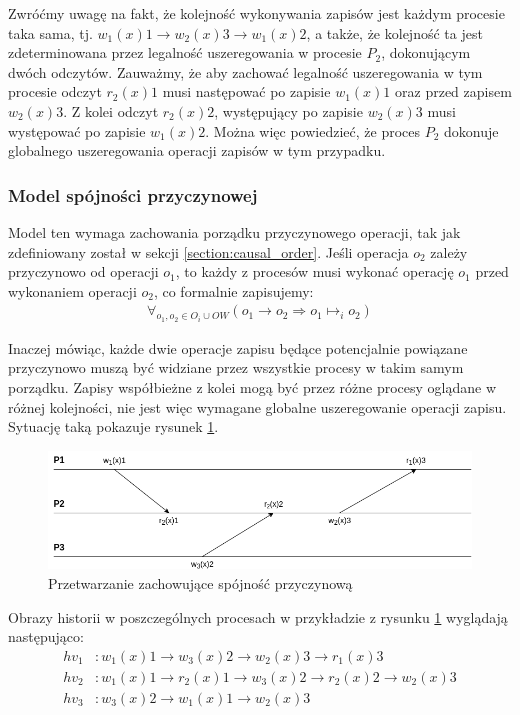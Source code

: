 Zwróćmy uwagę na fakt, że kolejność wykonywania zapisów jest każdym procesie taka sama, tj. $ w_1(x)1 \rightarrow w_2(x)3 \rightarrow w_1(x)2 $, a także, że kolejność ta jest zdeterminowana przez legalność uszeregowania w procesie $ P_2 $, dokonującym dwóch odczytów. Zauważmy, że aby zachować legalność uszeregowania w tym procesie odczyt $ r_2(x)1 $ musi następować po zapisie $ w_1(x)1 $ oraz przed zapisem $ w_2(x)3 $. Z kolei odczyt $ r_2(x)2 $, występujący po zapisie $ w_2(x)3 $ musi występować po zapisie $ w_1(x)2 $. Można więc powiedzieć, że proces $ P_2 $ dokonuje globalnego uszeregowania operacji zapisów w tym przypadku.

\subsubsection{Model spójności przyczynowej}

Model ten wymaga zachowania porządku przyczynowego operacji, tak jak zdefiniowany został w sekcji \ref{section:causal_order}. Jeśli operacja $ o_2 $ zależy przyczynowo od operacji $ o_1 $, to każdy z procesów musi wykonać operację $ o_1 $ przed wykonaniem operacji $ o_2 $, co formalnie zapisujemy:
\begin{align*}
    \forall_{o_1, o_2 \in O_i \cup OW} (o_1 \rightarrow o_2 \Rightarrow o_1 \mapsto_i o_2)
\end{align*}

Inaczej mówiąc, każde dwie operacje zapisu będące potencjalnie powiązane przyczynowo muszą być widziane przez wszystkie procesy w takim samym porządku. Zapisy współbieżne z kolei mogą być przez różne procesy oglądane w różnej kolejności, nie jest więc wymagane globalne uszeregowanie operacji zapisu. Sytuację taką pokazuje rysunek \ref{figure:replication_causal}.

\begin{figure}[t!]
    \includegraphics[width=\linewidth]{images/02-causal.png}
    \caption{Przetwarzanie zachowujące spójność przyczynową}
    \label{figure:replication_causal}
\end{figure}

Obrazy historii w poszczególnych procesach w przykładzie z rysunku \ref{figure:replication_causal} wyglądają następująco:
\begin{align*}
    hv_1&: w_1(x)1 \rightarrow w_3(x)2 \rightarrow w_2(x)3 \rightarrow r_1(x)3 \\
    hv_2&: w_1(x)1 \rightarrow r_2(x)1 \rightarrow w_3(x)2 \rightarrow r_2(x)2 \rightarrow w_2(x)3 \\
    hv_3&: w_3(x)2 \rightarrow w_1(x)1 \rightarrow w_2(x)3
\end{align*}

